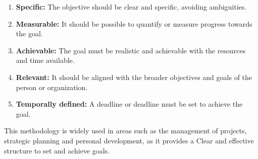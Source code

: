 \documentclass{article}
\begin{document}
\begin{enumerate}
	\item
	      \textbf{Specific:}
	      The objective should be clear and specific, avoiding ambiguities.
	\item
	      \textbf{Measurable:}
	      It should be possible to quantify or measure progress towards the goal.
	\item
	      \textbf{Achievable:}
	      The goal must be realistic and achievable with the resources and time
	      available.
	\item
	      \textbf{Relevant:}
	      It should be aligned with the broader objectives and goals of the
	      person or organization.
	\item
	      \textbf{Temporally defined:}
	      A deadline or deadline must be set to achieve the goal.
\end{enumerate}

\par This methodology is widely used in areas such as the management of
projects, strategic planning and personal development, as it provides a Clear
and effective structure to set and achieve goals.
\end{document}
